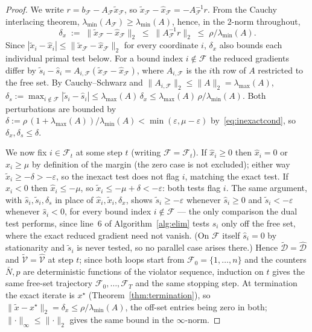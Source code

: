 \begin{proof}
We write $r = b_{\mathcal{F}} - A_{\mathcal{F}}\tilde x_{\mathcal{F}}$, so
$\tilde x_{\mathcal{F}} - \hat x_{\mathcal{F}} = -A_{\mathcal{F}}^{-1} r$. From the Cauchy
interlacing theorem, $\lambda_{\min}(A_{\mathcal{F}}) \ge \lambda_{\min}(A)$, hence, in the
$2$-norm throughout,
\[
  \delta_x \;:=\; \lVert \tilde x_{\mathcal{F}} - \hat x_{\mathcal{F}} \rVert_2
  \;\le\; \lVert A_{\mathcal{F}}^{-1} r \rVert_2
  \;\le\; \rho/\lambda_{\min}(A).
\]
Since $|\tilde x_i - \hat x_i| \le \lVert \tilde x_{\mathcal{F}} - \hat x_{\mathcal{F}}
\rVert_2$ for every coordinate $i$, $\delta_x$ also bounds each individual primal test below.
For a bound index $i \notin \mathcal{F}$ the reduced gradients differ by
$\tilde s_i - \hat s_i = A_{i,\mathcal{F}}(\tilde x_{\mathcal{F}} - \hat x_{\mathcal{F}})$,
where $A_{i,\mathcal{F}}$ is the $i$th row of $A$ restricted to the free set. By
Cauchy--Schwarz and $\lVert A_{i,\mathcal{F}} \rVert_2 \le \lVert A \rVert_2 =
\lambda_{\max}(A)$, $\delta_s := \max_{i \notin \mathcal{F}} |\tilde s_i - \hat s_i| \le
\lambda_{\max}(A)\,\delta_x \le \lambda_{\max}(A)\,\rho/\lambda_{\min}(A)$. Both
perturbations are bounded by
$\delta := \rho\,(1+\lambda_{\max}(A))/\lambda_{\min}(A) < \min(\varepsilon, \mu-\varepsilon)$
by~\eqref{eq:inexactcond}, so $\delta_x, \delta_s \le \delta$.

We now fix $i \in \mathcal{F}_t$ at some step $t$ (writing $\mathcal{F} = \mathcal{F}_t$). If
$\hat x_i \ge 0$ then $\hat x_i = 0$ or $\hat x_i \ge \mu$ by definition of the margin (the
zero case is not excluded); either way $\tilde x_i \ge
-\delta > -\varepsilon$, so the inexact test does not flag $i$, matching the exact test. If
$\hat x_i < 0$ then $\hat x_i \le -\mu$, so $\tilde x_i \le -\mu + \delta < -\varepsilon$: both
tests flag $i$. The same argument, with $\hat s_i, \tilde s_i, \delta_s$ in place of
$\hat x_i, \tilde x_i, \delta_x$, shows $\tilde s_i \ge -\varepsilon$ whenever $\hat s_i \ge 0$
and $\tilde s_i < -\varepsilon$ whenever $\hat s_i < 0$, for every bound index $i \notin
\mathcal{F}$ --- the only comparison the dual test performs, since line~6 of
Algorithm~\ref{alg:elim} tests $s_i$ only off the free set, where the exact reduced gradient
need not vanish. (On $\mathcal{F}$ itself $\hat s_i = 0$ by stationarity and $\tilde s_i$ is
never tested, so no parallel case arises there.) Hence $\tilde{\mathcal{D}} =
\hat{\mathcal{D}}$ and $\tilde{\mathcal{V}} = \hat{\mathcal{V}}$ at step $t$; since both loops
start from $\mathcal{F}_0 = \{1,\dots,n\}$ and the counters $\bar N, p$ are deterministic
functions of the violator sequence, induction on $t$ gives the same free-set trajectory
$\mathcal{F}_0,\dots,\mathcal{F}_T$ and the same stopping step. At termination the exact
iterate is $x^\star$ (Theorem~\ref{thm:termination}), so
$\lVert \tilde x - x^\star \rVert_2 = \delta_x \le \rho/\lambda_{\min}(A)$, the off-set
entries being zero in both; $\lVert\cdot\rVert_\infty \le \lVert\cdot\rVert_2$ gives the same
bound in the $\infty$-norm.
\end{proof}

